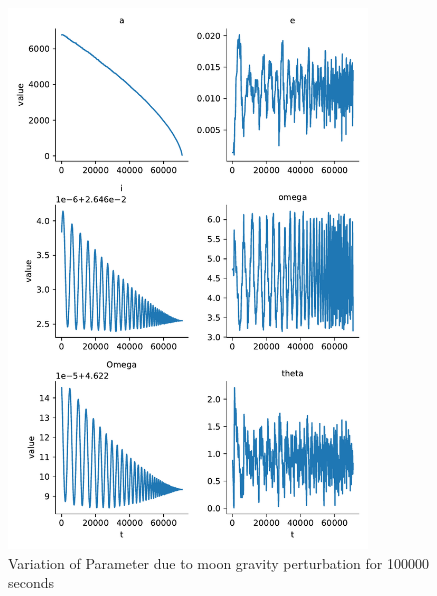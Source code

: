 \begin{figure}[H]
    \centering
    \includegraphics[width=0.85\textwidth]{../Figure/Q2/orbital_elements_variation_moon_100000}
    \caption{Variation of Parameter due to moon gravity perturbation for 100000 seconds}
\end{figure}